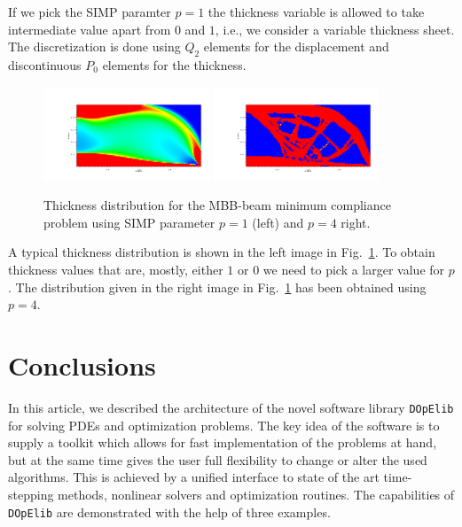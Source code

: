 \documentclass[smallextended]{svjour3}       %
\numberwithin{equation}{section}
\newcommand{\dope}{\texttt{DOpElib}}
\begin{document}
If we pick the SIMP paramter $p=1$ 
the thickness variable is allowed to take intermediate value apart from $0$ and $1$,
i.e., we consider a variable thickness sheet. The discretization is done 
using $Q_2$ elements for the displacement and discontinuous $P_0$ elements for the 
thickness.
\begin{figure}[b]
\centering
\hspace*{\fill}
\includegraphics[width=0.44\textwidth, viewport=205 88 975 500, clip]{Pictures/MBB.png}
\hspace{\fill}
\includegraphics[width=0.44\textwidth, viewport=205 88 975 500, clip]{Pictures/MBB-top.png}
\hspace{\fill}
\caption{Thickness distribution for the MBB-beam minimum compliance problem using SIMP parameter $p=1$ (left) and $p=4$ right.} 
\label{res:mbb}
\end{figure}
A typical thickness distribution is shown in the left image in Fig.~\ref{res:mbb}.
To obtain thickness values that are, mostly, either $1$ or $0$ we need 
to pick a larger value for $p$. The distribution given in the right image in Fig.~\ref{res:mbb}
has been obtained using $p=4$.



\section{Conclusions}
In this article, we described the architecture 
of the novel software library \dope{} for solving 
PDEs and optimization problems.  The key idea of the software is to supply a
toolkit which allows for fast implementation of the problems at hand, but at
the same time gives the user full flexibility to change or alter the used
algorithms. 
This is achieved by a unified interface 
to state of the art time-stepping methods, nonlinear solvers and optimization
routines. The capabilities of \dope{} are demonstrated with the help of three examples.
\end{document}
